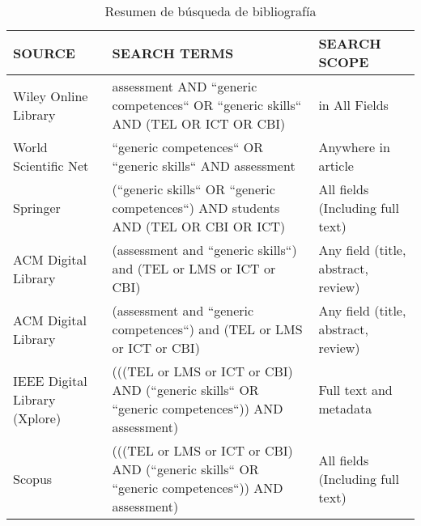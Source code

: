 \begin{table}[H]
  \begin{center}
  \begin{tabular}{| m{4cm} | m{7cm} | m{3cm} |}
    \hline
    SOURCE & SEARCH TERMS & SEARCH SCOPE \\
    \hline
    \hline
    Wiley Online Library & assessment AND ``generic competences`` OR ``generic skills`` AND (TEL OR ICT OR CBI) & in All Fields\\
    \hline
    World Scientific Net & ``generic competences`` OR ``generic skills`` AND assessment & Anywhere in article\\
    \hline
    Springer & (``generic skills`` OR ``generic competences``) AND  students AND (TEL OR CBI OR ICT) & All fields (Including full text)\\
    \hline
    ACM Digital Library & (assessment and ``generic skills``) and (TEL or LMS or ICT or CBI) & Any field (title, abstract, review)\\
    \hline
    ACM Digital Library & (assessment and ``generic competences``) and (TEL or LMS or ICT or CBI) & Any field (title, abstract, review)\\
    \hline
    IEEE Digital Library (Xplore) & (((TEL or LMS or ICT or CBI) AND (``generic skills`` OR ``generic competences``)) AND assessment) & Full text and metadata\\
    \hline
    Scopus & (((TEL or LMS or ICT or CBI) AND (``generic skills`` OR ``generic competences``)) AND assessment) & All fields (Including full text)\\
    \hline
  \end{tabular}
\end{center}
\caption{Resumen de búsqueda de bibliografía}
\label{tab:ResumenBusqueda}
\end{table} 


